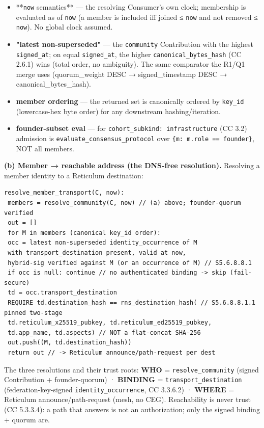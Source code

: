 \documentclass[11pt]{article}
\begin{document}
\begin{itemize}\setlength\itemsep{0pt}
\item **\texttt{now} semantics** — the resolving Consumer's own clock; membership is evaluated as of \texttt{now} (a member is included iff joined ≤ \texttt{now} and not removed ≤ \texttt{now}). No global clock assumed.
\item \textbf{"latest non-superseded"} — the \texttt{community} Contribution with the highest \texttt{signed\_at}; on equal \texttt{signed\_at}, the higher \texttt{canonical\_bytes\_hash} (CC 2.6.1) wins (total order, no ambiguity). The same comparator the R1/Q1 merge uses (quorum\_weight DESC → signed\_timestamp DESC → canonical\_bytes\_hash).
\item \textbf{member ordering} — the returned set is canonically ordered by \texttt{key\_id} (lowercase-hex byte order) for any downstream hashing/iteration.
\item \textbf{founder-subset eval} — for \texttt{cohort\_subkind: infrastructure} (CC 3.2) admission is \texttt{evaluate\_consensus\_protocol} over \texttt{\{m: m.role == founder\}}, NOT all members.
\end{itemize}


\textbf{(b) Member → reachable address (the DNS-free resolution).} Resolving a member identity to a Reticulum destination:


\begin{lstlisting}
resolve_member_transport(C, now):
 members = resolve_community(C, now) // (a) above; founder-quorum verified
 out = []
 for M in members (canonical key_id order):
 occ = latest non-superseded identity_occurrence of M
 with transport_destination present, valid at now,
 hybrid-sig verified against M (or an occurrence of M) // S5.6.8.8.1
 if occ is null: continue // no authenticated binding -> skip (fail-secure)
 td = occ.transport_destination
 REQUIRE td.destination_hash == rns_destination_hash( // S5.6.8.8.1.1 pinned two-stage
 td.reticulum_x25519_pubkey, td.reticulum_ed25519_pubkey,
 td.app_name, td.aspects) // NOT a flat-concat SHA-256
 out.push((M, td.destination_hash))
 return out // -> Reticulum announce/path-request per dest
\end{lstlisting}

The three resolutions and their trust roots: \textbf{WHO} = \texttt{resolve\_community} (signed Contribution + founder-quorum) · \textbf{BINDING} = \texttt{transport\_destination} (federation-key-signed \texttt{identity\_occurrence}, CC 3.3.6.2) · \textbf{WHERE} = Reticulum announce/path-request (mesh, no CEG). Reachability is never trust (CC 5.3.3.4): a path that answers is not an authorization; only the signed binding + quorum are.
\end{document}
